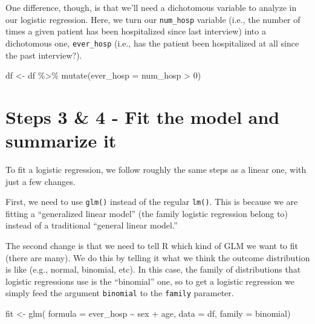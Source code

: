 \documentclass[
]{book}
\newenvironment{Shaded}{\begin{snugshade}}{\end{snugshade}}
\newcommand{\AttributeTok}[1]{\textcolor[rgb]{0.77,0.63,0.00}{#1}}
\newcommand{\DecValTok}[1]{\textcolor[rgb]{0.00,0.00,0.81}{#1}}
\newcommand{\FunctionTok}[1]{\textcolor[rgb]{0.00,0.00,0.00}{#1}}
\newcommand{\NormalTok}[1]{#1}
\newcommand{\OtherTok}[1]{\textcolor[rgb]{0.56,0.35,0.01}{#1}}
\newcommand{\SpecialCharTok}[1]{\textcolor[rgb]{0.00,0.00,0.00}{#1}}
\newcommand{\StringTok}[1]{\textcolor[rgb]{0.31,0.60,0.02}{#1}}
\begin{document}
One difference, though, is that we'll need a dichotomous variable to analyze in our logistic regression. Here, we turn our \texttt{num\_hosp} variable (i.e., the number of times a given patient has been hospitalized since last interview) into a dichotomous one, \texttt{ever\_hosp} (i.e., has the patient been hospitalized at all since the past interview?).

\begin{Shaded}
\begin{Highlighting}[]
\NormalTok{df }\OtherTok{\textless{}{-}}\NormalTok{ df }\SpecialCharTok{\%\textgreater{}\%} 
  \FunctionTok{mutate}\NormalTok{(}\AttributeTok{ever\_hosp =}\NormalTok{ num\_hosp }\SpecialCharTok{\textgreater{}} \DecValTok{0}\NormalTok{)}
\end{Highlighting}
\end{Shaded}

\hypertarget{steps-3-4---fit-the-model-and-summarize-it-1}{%
\section{Steps 3 \& 4 - Fit the model and summarize it}\label{steps-3-4---fit-the-model-and-summarize-it-1}}

To fit a logistic regression, we follow roughly the same steps as a linear one, with just a few changes.

First, we need to use \texttt{glm()} instead of the regular \texttt{lm()}. This is because we are fitting a ``generalized linear model'' (the family logistic regression belong to) instead of a traditional ``general linear model.''

The second change is that we need to tell R which kind of GLM we want to fit (there are many). We do this by telling it what we think the outcome distribution is like (e.g., normal, binomial, etc). In this case, the family of distributions that logistic regressions use is the ``binomial'' one, so to get a logistic regression we simply feed the argument \texttt{\textquotesingle{}binomial\textquotesingle{}} to the \texttt{family} parameter.

\begin{Shaded}
\begin{Highlighting}[]
\NormalTok{fit }\OtherTok{\textless{}{-}} \FunctionTok{glm}\NormalTok{(}
  \AttributeTok{formula =}\NormalTok{ ever\_hosp }\SpecialCharTok{\textasciitilde{}}\NormalTok{ sex }\SpecialCharTok{+}\NormalTok{ age,}
  \AttributeTok{data =}\NormalTok{ df,}
  \AttributeTok{family =} \StringTok{\textquotesingle{}binomial\textquotesingle{}}\NormalTok{)}
\end{Highlighting}
\end{Shaded}
\end{document}
